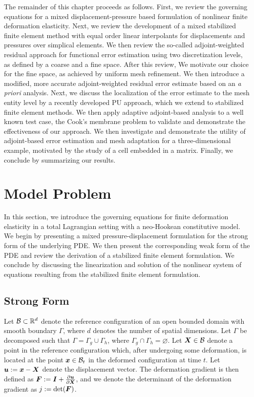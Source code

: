 The remainder of this chapter proceeds as follows. First, we review the
governing equations for a mixed displacement-pressure based formulation of
nonlinear finite deformation elasticity. Next, we review the development of
a mixed stabilized finite element method with equal order linear interpolants
for displacements and pressures over simplical elements. We then review the
so-called adjoint-weighted residual approach for functional error estimation
using two discretization levels, as defined by a coarse and a fine space.
After this review, We motivate our choice for the fine space, as achieved
by uniform mesh refinement. We then introduce a modified, more accurate
adjoint-weighted residual error estimate based on an \emph{a priori}
analysis. Next, we discuss the localization of the error estimate to the
mesh entity level by a recently developed PU approach, which we extend to
stabilized finite element methods. We then apply adaptive adjoint-based
analysis to a well known test case, the Cook's membrane problem to validate
and demonstrate the effectiveness of our approach. We then investigate and
demonstrate the utility of adjoint-based error estimation and mesh adaptation
for a three-dimensional example, motivated by the study of a cell embedded in
a matrix. Finally, we conclude by summarizing our results.

\section{Model Problem}

In this section, we introduce the governing equations for finite deformation
elasticity in a total Lagrangian setting with a neo-Hookean constitutive model.
We begin by presenting a mixed pressure-displacement formulation for the
strong form of the underlying PDE. We then present the corresponding weak form
of the PDE and review the derivation of a stabilized finite element
formulation. We conclude by discussing the linearization and solution
of the nonlinear system of equations resulting from the stabilized
finite element formulation.

\subsection{Strong Form}

Let $\mathcal{B} \subset \mathbb{R}^d$ denote the reference configuration of an open
bounded domain with smooth boundary $\Gamma$, where $d$ denotes the number of
spatial dimensions. Let $\Gamma$ be decomposed such that $\Gamma = \Gamma_g
\cup \Gamma_h$, where $\Gamma_g \cap \Gamma_h = \varnothing$. Let $\boldsymbol{X} \in
\mathcal{B}$ denote a point in the reference configuration which, after undergoing some
deformation, is located at the point $\boldsymbol{x} \in \mathcal{B}_t$ in the deformed
configuration at time $t$. Let $\boldsymbol{u} := \boldsymbol{x} - \boldsymbol{X}$ denote the
displacement vector. The deformation gradient is then defined as $\boldsymbol{F} :=
\boldsymbol{I} + \frac{\partial \boldsymbol{u}}{\partial \boldsymbol{X}}$, and we denote the
determinant of the deformation gradient as $j := \det(\boldsymbol{F})$.

